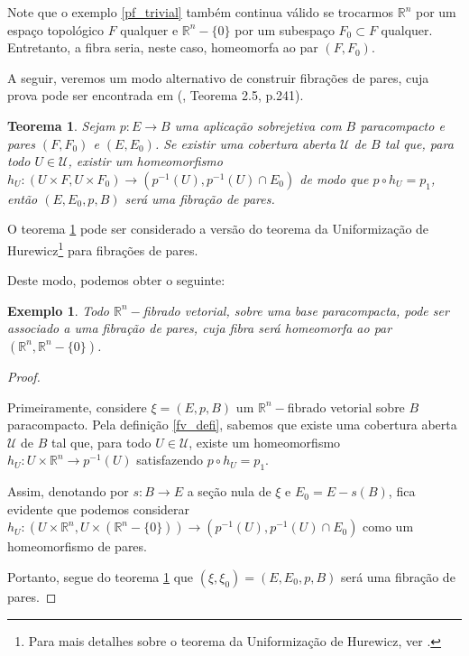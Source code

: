 \documentclass[12pt,oneside]{book} %
\newtheorem{teo}    {\hspace{0.5cm}Teorema}[chapter]
\newtheorem{ex}     {\hspace{0.5cm}Exemplo}[chapter]
\newcommand{\R}{\mathbb{R}}
\begin{document}
\par Note que o exemplo \ref{pf_trivial} também continua válido se trocarmos $\R^{n}$ por um espaço topológico $F$ qualquer e $\R^{n}-\{ 0 \}$ por um subespaço $F_{0}\subset F$ qualquer. Entretanto, a fibra seria, neste caso, homeomorfa ao par $(F,F_{0})$.

\par A seguir, veremos um modo alternativo de construir fibrações de pares, cuja prova pode ser encontrada em (\cite{allaud}, Teorema 2.5, p.241).

\begin{teo}\label{teo_hurewicz}
	Sejam $p:E\to B$ uma aplicação sobrejetiva com $B$ paracompacto e pares $(F,F_{0})$ e $(E,E_{0})$. Se existir uma cobertura aberta $\mathcal{U}$ de $B$ tal que, para todo $U\in\mathcal{U}$, existir um homeomorfismo $h_{U}:(U\times F,U\times F_{0})\to (p^{-1}(U),p^{-1}(U)\cap E_{0})$ de modo que $p\circ h_{U}=p_{1}$, então $(E,E_{0},p,B)$ será uma fibração de pares.
\end{teo}

\par O teorema \ref{teo_hurewicz} pode ser considerado a versão do teorema da Uniformização de Hurewicz\footnote{Para mais detalhes sobre o teorema da Uniformização de Hurewicz, ver \cite{hurewicz}.} para fibrações de pares.

\par Deste modo, podemos obter o seguinte:

\begin{ex}\label{pf_fv}
	Todo $\R^{n}-$fibrado vetorial, sobre uma base paracompacta, pode ser associado a uma fibração de pares, cuja fibra será homeomorfa ao par $(\R^{n},\R^{n}-\{ 0 \})$.
\end{ex}
\begin{proof}
	
	\
	
	\par Primeiramente, considere $\xi=(E,p,B)$ um $\R^{n}-$fibrado vetorial sobre $B$ paracompacto. Pela definição \ref{fv_defi}, sabemos que existe uma cobertura aberta $\mathcal{U}$ de $B$ tal que, para todo $U\in\mathcal{U}$, existe um homeomorfismo $h_{U}:U\times\R^{n}\to p^{-1}(U)$ satisfazendo $p\circ h_{U}=p_{1}$.
	
	\par Assim, denotando por $s:B\to E$ a seção nula de $\xi$ e $E_{0}=E-s(B)$, fica evidente que podemos considerar $h_{U}:(U\times\R^{n},U\times(\R^{n}-\{ 0 \}))\to (p^{-1}(U),p^{-1}(U)\cap E_{0})$ como um homeomorfismo de pares.
	
	\par Portanto, segue do teorema \ref{teo_hurewicz} que $(\xi,\xi_{0})=(E,E_{0},p,B)$ será uma fibração de pares.
	
\end{proof}
\end{document}
